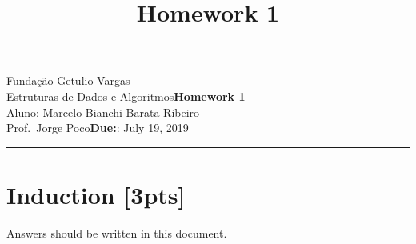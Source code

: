\documentclass{article}
\title{Homework 1}
\date{}
\newcommand{\assignment}{Homework 1}
\newcommand{\duedate}{July 19, 2019}
\begin{document}
	
	Fundação Getulio Vargas\hfill\\
	Estruturas de Dados e Algoritmos\hfill\textbf{\assignment}\\
	Aluno: Marcelo Bianchi Barata Ribeiro\\
	Prof.\ Jorge Poco\hfill\textbf{Due:}: \duedate\\
	\smallskip\hrule\bigskip
	
	{\let\newpage\relax\maketitle}
	\maketitle
	
	
	\section{Induction [3pts]}
	Answers should be written in this document. 
	
\end{document}
